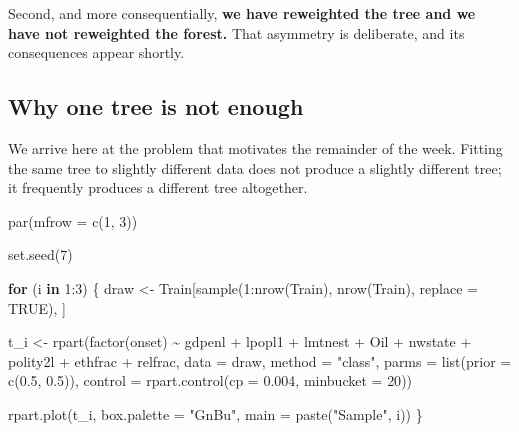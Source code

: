 \documentclass[
  a4paper,
]{scrbook}
\newenvironment{Shaded}{\begin{snugshade}}{\end{snugshade}}
\newcommand{\AttributeTok}[1]{\textcolor[rgb]{0.40,0.45,0.13}{#1}}
\newcommand{\ConstantTok}[1]{\textcolor[rgb]{0.56,0.35,0.01}{#1}}
\newcommand{\ControlFlowTok}[1]{\textcolor[rgb]{0.00,0.23,0.31}{\textbf{#1}}}
\newcommand{\DecValTok}[1]{\textcolor[rgb]{0.68,0.00,0.00}{#1}}
\newcommand{\FloatTok}[1]{\textcolor[rgb]{0.68,0.00,0.00}{#1}}
\newcommand{\FunctionTok}[1]{\textcolor[rgb]{0.28,0.35,0.67}{#1}}
\newcommand{\NormalTok}[1]{\textcolor[rgb]{0.00,0.23,0.31}{#1}}
\newcommand{\OtherTok}[1]{\textcolor[rgb]{0.00,0.23,0.31}{#1}}
\newcommand{\SpecialCharTok}[1]{\textcolor[rgb]{0.37,0.37,0.37}{#1}}
\newcommand{\StringTok}[1]{\textcolor[rgb]{0.13,0.47,0.30}{#1}}
\begin{document}
Second, and more consequentially, \textbf{we have reweighted the tree
and we have not reweighted the forest.} That asymmetry is deliberate,
and its consequences appear shortly.

\subsection{Why one tree is not
enough}\label{why-one-tree-is-not-enough}

We arrive here at the problem that motivates the remainder of the week.
Fitting the same tree to slightly different data does not produce a
slightly different tree; it frequently produces a different tree
altogether.

\begin{Shaded}
\begin{Highlighting}[]
\FunctionTok{par}\NormalTok{(}\AttributeTok{mfrow =} \FunctionTok{c}\NormalTok{(}\DecValTok{1}\NormalTok{, }\DecValTok{3}\NormalTok{))}

\FunctionTok{set.seed}\NormalTok{(}\DecValTok{7}\NormalTok{)}

\ControlFlowTok{for}\NormalTok{ (i }\ControlFlowTok{in} \DecValTok{1}\SpecialCharTok{:}\DecValTok{3}\NormalTok{) \{}
\NormalTok{  draw }\OtherTok{\textless{}{-}}\NormalTok{ Train[}\FunctionTok{sample}\NormalTok{(}\DecValTok{1}\SpecialCharTok{:}\FunctionTok{nrow}\NormalTok{(Train), }\FunctionTok{nrow}\NormalTok{(Train), }\AttributeTok{replace =} \ConstantTok{TRUE}\NormalTok{), ]}

\NormalTok{  t\_i }\OtherTok{\textless{}{-}} \FunctionTok{rpart}\NormalTok{(}\FunctionTok{factor}\NormalTok{(onset) }\SpecialCharTok{\textasciitilde{}}\NormalTok{ gdpenl }\SpecialCharTok{+}\NormalTok{ lpopl1 }\SpecialCharTok{+}\NormalTok{ lmtnest }\SpecialCharTok{+}\NormalTok{ Oil }\SpecialCharTok{+}
\NormalTok{                 nwstate }\SpecialCharTok{+}\NormalTok{ polity2l }\SpecialCharTok{+}\NormalTok{ ethfrac }\SpecialCharTok{+}\NormalTok{ relfrac,}
               \AttributeTok{data =}\NormalTok{ draw, }\AttributeTok{method =} \StringTok{"class"}\NormalTok{,}
               \AttributeTok{parms   =} \FunctionTok{list}\NormalTok{(}\AttributeTok{prior =} \FunctionTok{c}\NormalTok{(}\FloatTok{0.5}\NormalTok{, }\FloatTok{0.5}\NormalTok{)),}
               \AttributeTok{control =} \FunctionTok{rpart.control}\NormalTok{(}\AttributeTok{cp =} \FloatTok{0.004}\NormalTok{, }\AttributeTok{minbucket =} \DecValTok{20}\NormalTok{))}

  \FunctionTok{rpart.plot}\NormalTok{(t\_i, }\AttributeTok{box.palette =} \StringTok{"GnBu"}\NormalTok{, }\AttributeTok{main =} \FunctionTok{paste}\NormalTok{(}\StringTok{"Sample"}\NormalTok{, i))}
\NormalTok{\}}
\end{Highlighting}
\end{Shaded}
\end{document}
